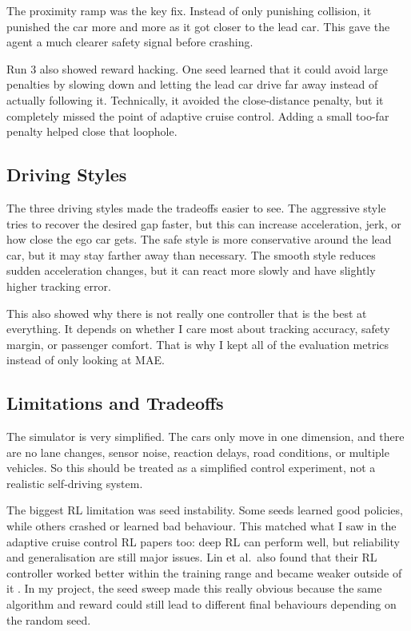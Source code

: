 \documentclass{article}
\begin{document}
The proximity ramp was the key fix. Instead of only punishing collision, it punished the car more and more as it got closer to the lead car. This gave the agent a much clearer safety signal before crashing.

Run 3 also showed reward hacking. One seed learned that it could avoid large penalties by slowing down and letting the lead car drive far away instead of actually following it. Technically, it avoided the close-distance penalty, but it completely missed the point of adaptive cruise control. Adding a small too-far penalty helped close that loophole.

\subsection*{Driving Styles}

The three driving styles made the tradeoffs easier to see. The aggressive style tries to recover the desired gap faster, but this can increase acceleration, jerk, or how close the ego car gets. The safe style is more conservative around the lead car, but it may stay farther away than necessary. The smooth style reduces sudden acceleration changes, but it can react more slowly and have slightly higher tracking error.

This also showed why there is not really one controller that is the best at everything. It depends on whether I care most about tracking accuracy, safety margin, or passenger comfort. That is why I kept all of the evaluation metrics instead of only looking at MAE.

\subsection*{Limitations and Tradeoffs}

The simulator is very simplified. The cars only move in one dimension, and there are no lane changes, sensor noise, reaction delays, road conditions, or multiple vehicles. So this should be treated as a simplified control experiment, not a realistic self-driving system.

The biggest RL limitation was seed instability. Some seeds learned good policies, while others crashed or learned bad behaviour. This matched what I saw in the adaptive cruise control RL papers too: deep RL can perform well, but reliability and generalisation are still major issues. Lin et al.\ also found that their RL controller worked better within the training range and became weaker outside of it \cite{lin2020comparison}. In my project, the seed sweep made this really obvious because the same algorithm and reward could still lead to different final behaviours depending on the random seed.
\end{document}
